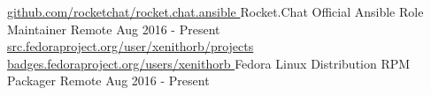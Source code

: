 \begin{cventries}
	\cventry
	{ 
		\href{https://github.com/rocketchat/rocket.chat.ansible}{ github.com/rocketchat/rocket.chat.ansible }
	}
	{Rocket.Chat Official Ansible Role Maintainer}
	{Remote}
	{Aug 2016 - Present}{}
	\cventry
	{
		\href{https://src.fedoraproject.org/user/xenithorb/projects}{ src.fedoraproject.org/user/xenithorb/projects }
		\href{https://badges.fedoraproject.org/user/xenithorb}{ badges.fedoraproject.org/users/xenithorb }
	}
	{Fedora Linux Distribution RPM Packager}
	{Remote}
	{Aug 2016 - Present}{}
\end{cventries}